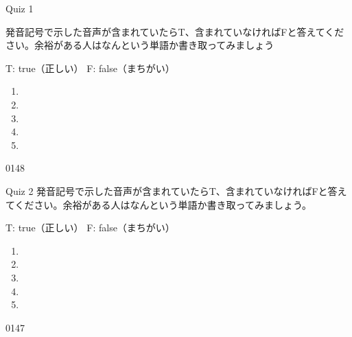 \documentclass[aspectratio=169,xcolor={dvipsnames,table}]{beamer}
\begin{document}
\begin{frame}[plain]{Quiz 1 }

\large
発音記号で示した音声が含まれていたらT、含まれていなければFと答えてください。余裕がある人はなんという単語か書き取ってみましょう

\hfill{}{\scriptsize T: true（正しい）\hspace{5pt} F: false（まちがい）}
 \begin{enumerate}
  \item \mbox{}\hspace{1\zw}
  \item \mbox{}\visible<3->{T}\hspace{1\zw}
  \item \mbox{}\hspace{1\zw}
  \item \mbox{}\hspace{1\zw}
  \item \mbox{}\hspace{1\zw}
 \end{enumerate}

\hfill{\tiny 0148}\,{\scriptsize {}}
\end{frame}
\begin{frame}[plain]{Quiz 2 }
\large
発音記号で示した音声が含まれていたらT、含まれていなければFと答えてください。余裕がある人はなんという単語か書き取ってみましょう。

\hfill{}{\scriptsize T: true（正しい）\hspace{5pt} F: false（まちがい）}
 \begin{enumerate}
  \item \mbox{}\visible<2->{F}\hspace{1\zw}
  \item \mbox{}\hspace{1\zw}
  \item \mbox{}\visible<4->{T}\hspace{1\zw}
  \item \mbox{}\hspace{1\zw}
  \item \mbox{}\hspace{1\zw}
 \end{enumerate}

\hfill{\tiny 0147}\,{\scriptsize {}}

\end{frame}
\end{document}

